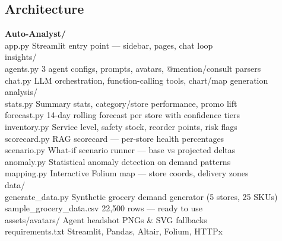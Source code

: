 \documentclass[11pt,a4paper]{article}
\begin{document}
\subsection{Architecture}
\vspace{0.3cm}
\begin{tcolorbox}[colback=DarkCard, colframe=CareemGreen, leftrule=3mm, arc=4pt,
  fontupper=\color{LightText}\footnotesize\ttfamily]
\textcolor{CareemGreen}{\textbf{Auto-Analyst/}}\\
\quad\textcolor{CareemGreen}{app.py} \hspace{3.6cm} Streamlit entry point --- sidebar, pages, chat loop\\
\quad\textcolor{CareemGreen}{insights/}\\
\quad\quad agents.py \hspace{2.4cm} 3 agent configs, prompts, avatars, @mention/consult parsers\\
\quad\quad chat.py \hspace{3cm} LLM orchestration, function-calling tools, chart/map generation\\
\quad\textcolor{CareemGreen}{analysis/}\\
\quad\quad stats.py \hspace{3cm} Summary stats, category/store performance, promo lift\\
\quad\quad forecast.py \hspace{2.4cm} 14-day rolling forecast per store with confidence tiers\\
\quad\quad inventory.py \hspace{2.1cm} Service level, safety stock, reorder points, risk flags\\
\quad\quad scorecard.py \hspace{2cm} RAG scorecard --- per-store health percentages\\
\quad\quad scenario.py \hspace{2.1cm} What-if scenario runner --- base vs projected deltas\\
\quad\quad anomaly.py \hspace{2.15cm} Statistical anomaly detection on demand patterns\\
\quad\quad mapping.py \hspace{2.1cm} Interactive Folium map --- store coords, delivery zones\\
\quad\textcolor{CareemGreen}{data/}\\
\quad\quad generate\_data.py \hspace{1.5cm} Synthetic grocery demand generator (5 stores, 25 SKUs)\\
\quad\quad sample\_grocery\_data.csv \hspace{0.8cm} 22,500 rows --- ready to use\\
\quad\textcolor{CareemGreen}{assets/avatars/} \hspace{2.1cm} Agent headshot PNGs \& SVG fallbacks\\
\quad\textcolor{CareemGreen}{requirements.txt} \hspace{2cm} Streamlit, Pandas, Altair, Folium, HTTPx
\end{tcolorbox}
\end{document}
